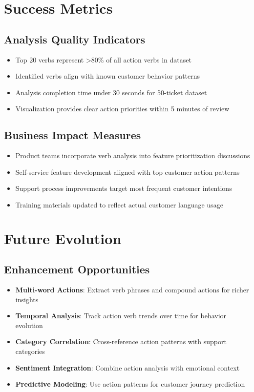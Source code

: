 \documentclass[11pt]{article}
\begin{document}
\section{Success Metrics}

\subsection{Analysis Quality Indicators}
\begin{itemize}
\item Top 20 verbs represent >80\% of all action verbs in dataset
\item Identified verbs align with known customer behavior patterns
\item Analysis completion time under 30 seconds for 50-ticket dataset
\item Visualization provides clear action priorities within 5 minutes of review
\end{itemize}

\subsection{Business Impact Measures}
\begin{itemize}
\item Product teams incorporate verb analysis into feature prioritization discussions
\item Self-service feature development aligned with top customer action patterns
\item Support process improvements target most frequent customer intentions
\item Training materials updated to reflect actual customer language usage
\end{itemize}

\section{Future Evolution}

\subsection{Enhancement Opportunities}
\begin{itemize}
\item \textbf{Multi-word Actions}: Extract verb phrases and compound actions for richer insights
\item \textbf{Temporal Analysis}: Track action verb trends over time for behavior evolution
\item \textbf{Category Correlation}: Cross-reference action patterns with support categories
\item \textbf{Sentiment Integration}: Combine action analysis with emotional context
\item \textbf{Predictive Modeling}: Use action patterns for customer journey prediction
\end{itemize}
\end{document}
